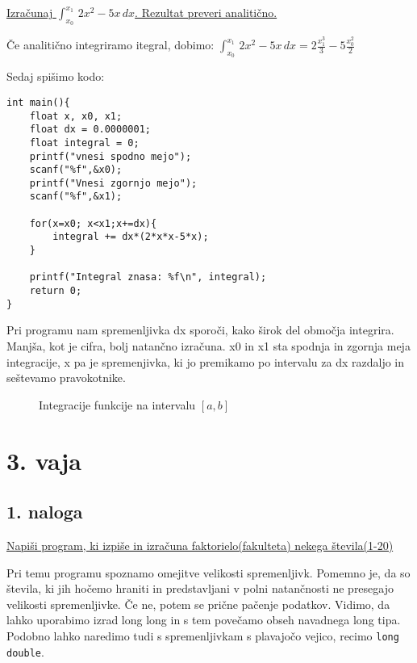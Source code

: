 \documentclass[a4paper, 12pt]{article}
\begin{document}
\underline{Izračunaj $\int_{x_0}^{x_1}\, 2x^2-5x\, dx$. Rezultat preveri analitično.}	\

Če analitično integriramo itegral, dobimo: $\int_{x_0}^{x_1}\, 2x^2-5x\, dx = 2\frac{x_1^3}3-5\frac{x_0^2}2$\

Sedaj spišimo kodo:
\begin{lstlisting}
int main(){
	float x, x0, x1;
	float dx = 0.0000001;
	float integral = 0;
	printf("vnesi spodno mejo");
	scanf("%f",&x0);
	printf("Vnesi zgornjo mejo");
	scanf("%f",&x1);

	for(x=x0; x<x1;x+=dx){
		integral += dx*(2*x*x-5*x);
	}

	printf("Integral znasa: %f\n", integral);
	return 0;
}
\end{lstlisting}
Pri programu nam spremenljivka dx sporoči, kako širok del območja integrira. Manjša, kot je cifra, bolj natančno izračuna. x0 in x1 sta spodnja in zgornja meja integracije, x pa je spremenjivka, ki jo premikamo po intervalu za dx razdaljo in seštevamo pravokotnike.
	
\begin{figure}[!htbp]
	\centering
	\caption{Integracije funkcije na intervalu $[a, b]$}
\end{figure}
	
\section*{3. vaja}
\subsection*{1. naloga}

\underline{Napiši program, ki izpiše in izračuna faktorielo(fakulteta) nekega števila(1-20)}\

Pri temu programu spoznamo omejitve velikosti spremenljivk. Pomemno je, da so števila, ki jih hočemo hraniti in predstavljani v polni natančnosti ne presegajo velikosti spremenljivke. Če ne, potem se prične pačenje podatkov. Vidimo, da lahko uporabimo izrad long long in s tem povečamo obseh navadnega long tipa. Podobno lahko naredimo tudi s spremenljivkam s plavajočo vejico, recimo \lstinline|long double|.
\end{document}
